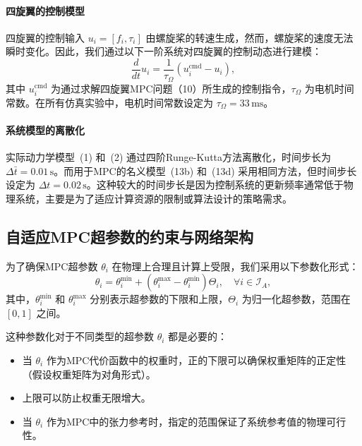 \documentclass[lang=chs, degree=master, blindreview=false, winfonts=true]{yanputhesis}
\begin{document}
\paragraph{四旋翼的控制模型} 四旋翼的控制输入 \( u_i = [f_i, \tau_i] \) 由螺旋桨的转速生成，然而，螺旋桨的速度无法瞬时变化。因此，我们通过以下一阶系统对四旋翼的控制动态进行建模：
\begin{equation}
    \frac{d}{dt} u_i = \frac{1}{\tau_\Omega} \left( u_i^\text{cmd} - u_i \right),
\end{equation}
其中 \( u_i^\text{cmd} \) 为通过求解四旋翼MPC问题（10）所生成的控制指令，\( \tau_\Omega \) 为电机时间常数。在所有仿真实验中，电机时间常数设定为 \( \tau_\Omega = 33 \, \text{ms} \)。

\paragraph{系统模型的离散化} 实际动力学模型~(1) 和~(2) 通过四阶Runge-Kutta方法离散化，时间步长为 \( \Delta \bar{t} = 0.01 \, \text{s} \)。而用于MPC的名义模型~(13b) 和~(13d) 采用相同方法，但时间步长设定为 \( \Delta t = 0.02 \, \text{s} \)。这种较大的时间步长是因为控制系统的更新频率通常低于物理系统，主要是为了适应计算资源的限制或算法设计的策略需求。

\subsection{自适应MPC超参数的约束与网络架构}

为了确保MPC超参数 \( \theta_i \) 在物理上合理且计算上受限，我们采用以下参数化形式：
\begin{equation}
    \theta_i = \theta_i^\text{min} + \left( \theta_i^\text{max} - \theta_i^\text{min} \right) \Theta_i, \quad \forall i \in \mathcal{I}_A,
\end{equation}
其中，\( \theta_i^\text{min} \) 和 \( \theta_i^\text{max} \) 分别表示超参数的下限和上限，\( \Theta_i \) 为归一化超参数，范围在 \([0, 1]\) 之间。

这种参数化对于不同类型的超参数 \( \theta_i \) 都是必要的：
\begin{itemize}
    \item 当 \( \theta_i \) 作为MPC代价函数中的权重时，正的下限可以确保权重矩阵的正定性（假设权重矩阵为对角形式）。
    \item 上限可以防止权重无限增大。
    \item 当 \( \theta_i \) 作为MPC中的张力参考时，指定的范围保证了系统参考值的物理可行性。
\end{itemize}
\end{document}
